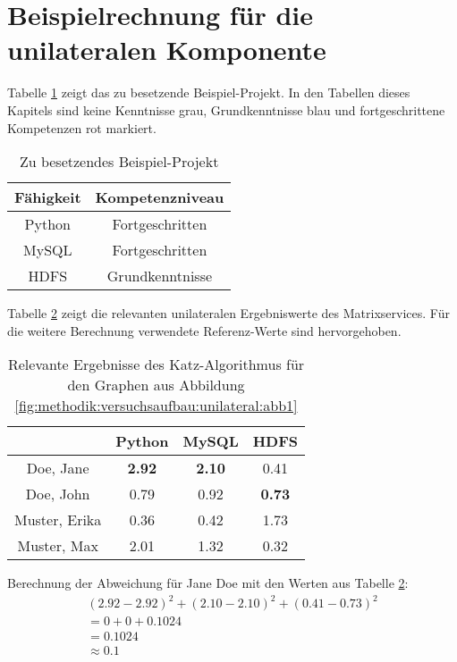 \section{Beispielrechnung für die unilateralen Komponente}
\label{ch:nebenrechnungen:unilateral}
Tabelle \ref{tbl:berechnungDerKatzZentralitaetPseudoMitarbeiter:tbl1} zeigt das zu besetzende Beispiel-Projekt. In den Tabellen dieses Kapitels sind keine Kenntnisse grau, Grundkenntnisse blau und fortgeschrittene Kompetenzen rot markiert.
\begin{table}[h]
	\centering
	\begin{tabular}{c|c}
		Fähigkeit & Kompetenzniveau \\
		\hline
		Python  & \cellcolor{usercolor}Fortgeschritten\\
		MySQL   & \cellcolor{usercolor}Fortgeschritten\\
		HDFS    & \cellcolor{itemcolor}Grundkenntnisse
	\end{tabular}
	\caption{Zu besetzendes Beispiel-Projekt}
	\label{tbl:berechnungDerKatzZentralitaetPseudoMitarbeiter:tbl1}
\end{table}

Tabelle \ref{tbl:berechnungDerKatzZentralitaetPseudoMitarbeiter:tbl2} zeigt die relevanten unilateralen Ergebniswerte des Matrixservices. Für die weitere Berechnung verwendete Referenz-Werte sind hervorgehoben.

\begin{table}[h]
	\centering
	\begin{tabular}{c|c|c|c}
		& Python & MySQL & HDFS\\ 
		\hline
		Doe, Jane     & \cellcolor{usercolor}\textbf{2.92} & \cellcolor{itemcolor}\textbf{2.10} & \cellcolor{exxetagray}0.41\\
		Doe, John     & \cellcolor{exxetagray}0.79 & \cellcolor{itemcolor}0.92 & \cellcolor{itemcolor}\textbf{0.73}\\
		Muster, Erika & \cellcolor{exxetagray}0.36 & \cellcolor{exxetagray}0.42 & \cellcolor{usercolor}1.73\\
		Muster, Max   & \cellcolor{itemcolor}2.01 & \cellcolor{itemcolor}1.32 & \cellcolor{exxetagray}0.32
	\end{tabular}
	\caption{Relevante Ergebnisse des Katz-Algorithmus für den Graphen aus Abbildung \ref{fig:methodik:versuchsaufbau:unilateral:abb1}}
	\label{tbl:berechnungDerKatzZentralitaetPseudoMitarbeiter:tbl2}
\end{table}

Berechnung der Abweichung für Jane Doe mit den Werten aus Tabelle \ref{tbl:berechnungDerKatzZentralitaetPseudoMitarbeiter:tbl2}:
\begin{gather}
	\nonumber (2.92-2.92)^2 + (2.10-2.10)^2 + (0.41-0.73)^2\\
	\nonumber = 0 + 0 + 0.1024\\
	\nonumber = 0.1024\\
	\approx 0.1
	\label{frml:nebenrechnungen:unilateral:jane}
\end{gather}


